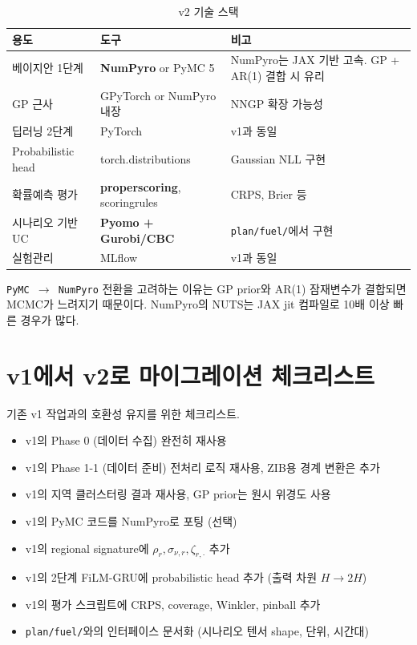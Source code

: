 \documentclass[11pt,a4paper]{article}
\begin{document}
\begin{table}[H]
\centering
\small
\caption{v2 기술 스택}
\begin{tabular}{lll}
\toprule
용도 & 도구 & 비고 \\
\midrule
베이지안 1단계 & \textbf{NumPyro} or PyMC 5 & NumPyro는 JAX 기반 고속. GP + AR(1) 결합 시 유리 \\
GP 근사 & GPyTorch or NumPyro 내장 & NNGP 확장 가능성 \\
딥러닝 2단계 & PyTorch & v1과 동일 \\
Probabilistic head & torch.distributions & Gaussian NLL 구현 \\
확률예측 평가 & \textbf{properscoring}, scoringrules & CRPS, Brier 등 \\
시나리오 기반 UC & \textbf{Pyomo + Gurobi/CBC} & \texttt{plan/fuel/}에서 구현 \\
실험관리 & MLflow & v1과 동일 \\
\bottomrule
\end{tabular}
\end{table}

\texttt{PyMC $\to$ NumPyro} 전환을 고려하는 이유는 GP prior와 AR(1) 잠재변수가 결합되면 MCMC가 느려지기 때문이다. NumPyro의 NUTS는 JAX jit 컴파일로 10배 이상 빠른 경우가 많다.

\section{v1에서 v2로 마이그레이션 체크리스트}

기존 v1 작업과의 호환성 유지를 위한 체크리스트.

\begin{itemize}[leftmargin=2em]
    \item[$\square$] v1의 Phase 0 (데이터 수집) 완전히 재사용
    \item[$\square$] v1의 Phase 1-1 (데이터 준비) 전처리 로직 재사용, ZIB용 경계 변환은 추가
    \item[$\square$] v1의 지역 클러스터링 결과 재사용, GP prior는 원시 위경도 사용
    \item[$\square$] v1의 PyMC 코드를 NumPyro로 포팅 (선택)
    \item[$\square$] v1의 regional signature에 $\rho_r, \sigma_{\nu,r}, \zeta_{r,\cdot}$ 추가
    \item[$\square$] v1의 2단계 FiLM-GRU에 probabilistic head 추가 (출력 차원 $H \to 2H$)
    \item[$\square$] v1의 평가 스크립트에 CRPS, coverage, Winkler, pinball 추가
    \item[$\square$] \texttt{plan/fuel/}와의 인터페이스 문서화 (시나리오 텐서 shape, 단위, 시간대)
\end{itemize}
\end{document}
